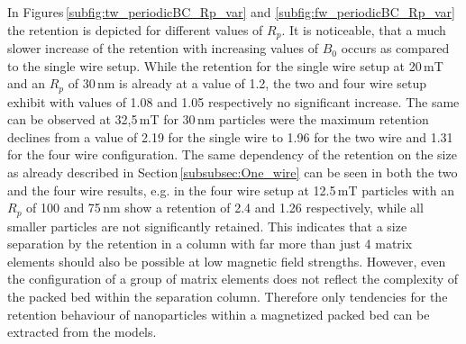 In Figures\,\ref{subfig:tw_periodicBC_Rp_var} and \ref{subfig:fw_periodicBC_Rp_var} the retention is depicted for different values of $R_{p}$. It is noticeable, that a much slower increase of the retention with increasing values of $B_{0}$ occurs as compared to the single wire setup. While the retention for the single wire setup at 20\,mT and an $R_{p}$ of 30\,nm is already at a value of 1.2, the two and four wire setup exhibit with values of 1.08 and 1.05 respectively no significant increase. The same can be observed at 32,5\,mT for 30\,nm particles were the maximum retention declines from a value of 2.19 for the single wire to 1.96 for the two wire and 1.31 for the four wire configuration. The same dependency of the retention on the size as already described in Section\,\ref{subsubsec:One_wire} can be seen in both the two and the four wire results, e.g. in the four wire setup at 12.5\,mT particles with an $R_{p}$ of 100 and 75\,nm show a retention of 2.4 and 1.26 respectively, while all smaller particles are not significantly retained. This indicates that a size separation by the retention in a column with far more than just 4 matrix elements should also be possible at low magnetic field strengths. However, even the configuration of a group of matrix elements does not reflect the complexity of the packed bed within the separation column. Therefore only tendencies for the retention behaviour of nanoparticles within a magnetized packed bed can be extracted from the models.    


